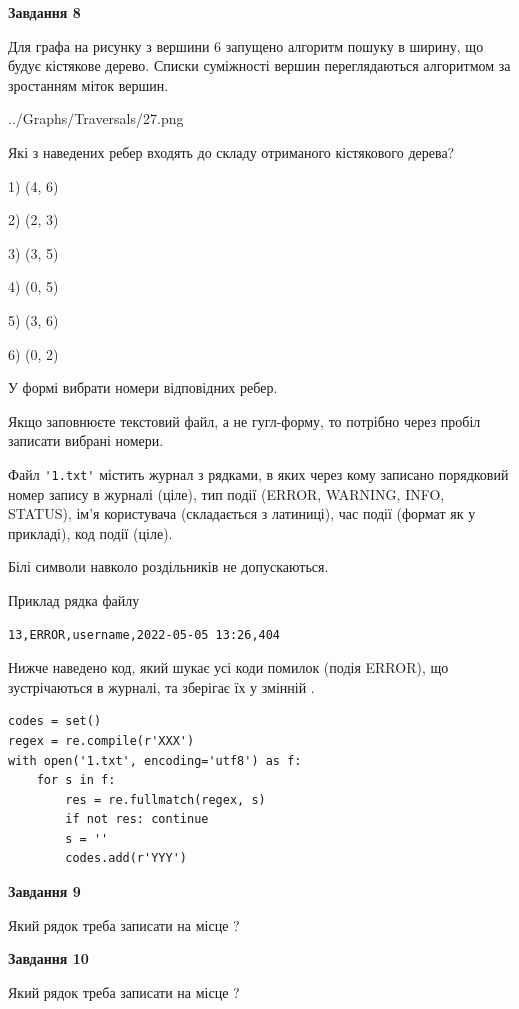 \documentclass[12pt, ukrainian]{article}
\def\code#1{\Verb!#1!}
\begin{document}
{\begin {large}
{\begin {center}\textbf{Завдання 8}\end {center}}\par
Для графа на рисунку з вершини 6 запущено алгоритм пошуку в ширину, що будує кістякове дерево. Списки суміжності вершин переглядаються алгоритмом за зростанням міток вершин.\par
\begin{center}
	{../Graphs/Traversals/27.png}
\end{center}
\par Які з наведених ребер входять до складу отриманого кістякового дерева?\par
1) (4, 6)\par
2) (2, 3)\par
3) (3, 5)\par
4) (0, 5)\par
5) (3, 6)\par
6) (0, 2)\par
{\vskip 15pt} У формі вибрати номери відповідних ребер.


Якщо заповнюєте текстовий файл, а не гугл-форму, то потрібно через пробіл записа\-ти вибрані номери.\par
\newpage


Файл \code{'1.txt'} містить журнал з рядками, в яких через кому записано поряд\-ко\-вий номер запису в журналі (ціле), тип події (ERROR, WARNING, INFO, STATUS), ім'я користувача (складається з латиниці), час події (фор\-мат як у прикладі), код події (ціле).

Білі символи навколо роздільників не допускаються.

Приклад рядка файлу



\begin{verbatim}
13,ERROR,username,2022-05-05 13:26,404
\end{verbatim}


Нижче наведено код, який шукає усі коди помилок (подія ERROR), що зустріча\-ють\-ся в журналі, та зберігає їх у змінній .



\begin{verbatim}
codes = set()
regex = re.compile(r'XXX')
with open('1.txt', encoding='utf8') as f:
    for s in f:
        res = re.fullmatch(regex, s)
        if not res: continue
        s = ''
        codes.add(r'YYY')
\end{verbatim}


{\begin {center}\textbf{Завдання 9}\end {center}}\par
Який рядок треба записати на місце  ?\par
\vspace{5mm}


{\begin {center}\textbf{Завдання 10}\end {center}}\par
Який рядок треба записати на місце  ?\par


\newpage


\end {large}}
\end{document}
